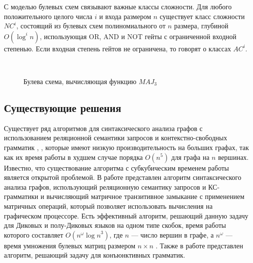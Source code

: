 С моделью булевых схем связывают важные классы сложности.  Для любого положительного целого числа $i$ и входа размером $n$ существует класс сложности $NC^i$, состоящий из булевых схем полиномиального от $n$ размера, глубиной $O(\log^i n)$, использующая OR, AND и NOT гейты с ограниченной входной степенью. Если входная степень гейтов не ограничена, то говорят о классах $AC^i$.
\begin{figure}

\centering
{}
 \\

	\caption{Булева схема, вычисляющая функцию $MAJ_3$}
\label{circuit}
\end{figure}


\subsection{Существующие решения}
Существует ряд алгоритмов для синтаксического анализа графов с использованием реляционной семантики запросов и контекстно-свободных грамматик \cite{HellingsCFPQ}, \cite{MatrixMult}, которые имеют низкую производительность на больших графах, так как их время работы в худшем случае порядка $O(n^5)$ для графа на $n$ вершинах. Известно, что существование алгоритма с субкубическим временем работы является открытой проблемой. В работе \cite{MatrixMult} представлен алгоритм синтаксического анализа графов, использующий реляционную семантику запросов и КС-грамматики и вычисляющий матричное транзитивное замыкание с применением матричных операций, который позволяет использовать вычисления на графическом процессоре. Есть эффективный алгоритм, решающий данную задачу для Диковых и полу-Диковых языков на одном типе скобок, время работы которого составляет $O(n^{\omega}{\log{n}}^3)$, где $n$ ---  число вершин в графе, а $n^{\omega}$ --- время умножения булевых матриц размером $n \times n$ \cite{Bradford}. Также в работе \cite{ConjPath} представлен алгоритм, решающий задачу для конъюнктивных грамматик.

